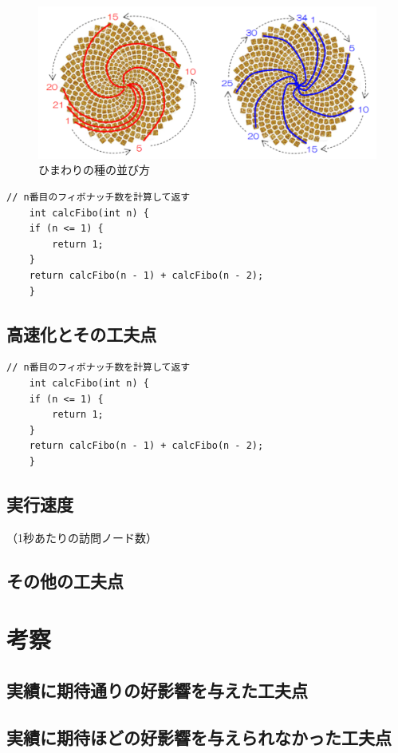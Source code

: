 \documentclass[10pt,a4j]{ujarticle} %
\begin{document}
\begin{figure}[!hbt]
  \centering
  \includegraphics[bb=0 0 782 352,width=0.3\linewidth]{himawari.png}
  \caption{ひまわりの種の並び方}
  \label{fig:himawari}
\end{figure}

\begin{lstlisting}[caption=calcFiboメソッドの工夫点,label=src:calcFibo]
    // n番目のフィボナッチ数を計算して返す
    int calcFibo(int n) {
	if (n <= 1) {
	    return 1;
	}
	return calcFibo(n - 1) + calcFibo(n - 2);
    }
\end{lstlisting}


\subsection{高速化とその工夫点}
\begin{lstlisting}[caption=calcFiboメソッドの工夫点,label=src:calcFibo]
    // n番目のフィボナッチ数を計算して返す
    int calcFibo(int n) {
	if (n <= 1) {
	    return 1;
	}
	return calcFibo(n - 1) + calcFibo(n - 2);
    }
\end{lstlisting}


\subsection{実行速度}（1秒あたりの訪問ノード数）


\subsection{その他の工夫点}


\section{考察}

\subsection{実績に期待通りの好影響を与えた工夫点}


\subsection{実績に期待ほどの好影響を与えられなかった工夫点}
\end{document}

